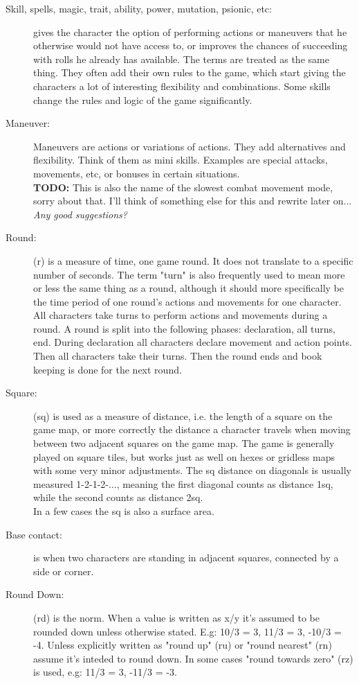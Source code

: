 \begin{description}
\item[Skill, spells, magic, trait, ability, power, mutation, psionic, etc:] gives the character the option of performing actions or maneuvers that he otherwise would not have access to, or improves the chances of succeeding with rolls he already has available. The terms are treated as the same thing. They often add their own rules to the game, which start giving the characters a lot of interesting flexibility and combinations. Some skills change the rules and logic of the game significantly.

\item[Maneuver:] Maneuvers are actions or variations of actions. They add alternatives and flexibility. Think of them as mini skills. Examples are special attacks, movements, etc, or bonuses in certain situations.
\\  \textbf{TODO:} This is also the name of the slowest combat movement mode, sorry about that. I'll think of something else for this and rewrite later on... \emph{Any good suggestions?}

\item[Round:] (r) is a measure of time, one game round. It does not translate to a specific number of seconds. The term "turn" is also frequently used to mean more or less the same thing as a round, although it should more specifically be the time period of one round's actions and movements for one character. All characters take turns to perform actions and movements during a round.
A round is split into the following phases: declaration, all turns, end.
During declaration all characters declare movement and action points. Then all characters take their turns. Then the round ends and book keeping is done for the next round.

\item[Square:] (sq) is used as a measure of distance, i.e. the length of a square on the game map, or more correctly the distance a character travels when moving between two adjacent squares on the game map. The game is generally played on square tiles, but works just as well on hexes or gridless maps with some very minor adjustments.
The sq distance on diagonals is usually measured 1-2-1-2-..., meaning the first diagonal counts as distance 1sq, while the second counts as distance 2sq.\\
In a few cases the sq is also a surface area.

\item[Base contact:] is when two characters are standing in adjacent squares, connected by a side or corner.

\item[Round Down:] (rd) is the norm. When a value is written as x/y it's assumed to be rounded down unless otherwise stated. E.g: 10/3 = 3, 11/3 = 3, -10/3 = -4.
Unless explicitly written as "round up" (ru) or "round nearest" (rn) assume it's inteded to round down. In some cases "round towards zero" (rz) is used, e.g: 11/3 = 3, -11/3 = -3.

\end{description}










